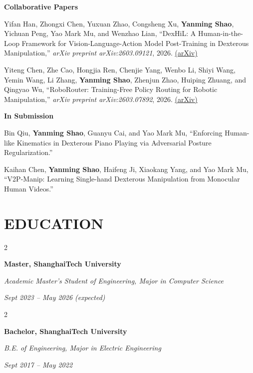 \documentclass[10pt, letterpaper]{article}
\newenvironment{twocolentry}[2][]{
    \onecolentry
    \def\secondColumn{#2}
    \setcolumnwidth{\fill, 4.5 cm}
    \begin{paracol}{2}
}{
    \switchcolumn \raggedleft \secondColumn
    \end{paracol}
    \endonecolentry
} %
\let\hrefWithoutArrow\href
\renewcommand{\href}[2]{\hrefWithoutArrow{#1}{\ifthenelse{\equal{#2}{}}{ }{#2 }\raisebox{.15ex}{\footnotesize \faExternalLink*}}}
\begin{document}
\textbf{Collaborative Papers}

\begin{enumerate}[label={[\arabic*]}, resume]
  \item Yifan Han, Zhongxi Chen, Yuxuan Zhao, Congsheng Xu, \textbf{Yanming Shao}, Yichuan Peng, Yao Mark Mu, and Wenzhao Lian,
        ``DexHiL: A Human-in-the-Loop Framework for Vision-Language-Action Model Post-Training in Dexterous Manipulation,''
        \emph{arXiv preprint arXiv:2603.09121}, 2026. \hrefWithoutArrow{https://arxiv.org/abs/2603.09121}{(arXiv)}

  \item Yiteng Chen, Zhe Cao, Hongjia Ren, Chenjie Yang, Wenbo Li, Shiyi Wang, Yemin Wang, Li Zhang, \textbf{Yanming Shao}, Zhenjun Zhao, Huiping Zhuang, and Qingyao Wu,
        ``RoboRouter: Training-Free Policy Routing for Robotic Manipulation,''
        \emph{arXiv preprint arXiv:2603.07892}, 2026. \hrefWithoutArrow{https://arxiv.org/abs/2603.07892}{(arXiv)}
\end{enumerate}

\textbf{In Submission}

\begin{enumerate}[label={[\arabic*]}, resume]
  \item Bin Qiu, \textbf{Yanming Shao}, Guanyu Cai, and Yao Mark Mu,
        ``Enforcing Human-like Kinematics in Dexterous Piano Playing via Adversarial Posture Regularization.''

  \item Kaihan Chen, \textbf{Yanming Shao}, Haifeng Ji, Xiaokang Yang, and Yao Mark Mu,
        ``V2P-Manip: Learning Single-hand Dexterous Manipulation from Monocular Human Videos.''
\end{enumerate}


\section{EDUCATION}

    \begin{twocolentry}{ 
    \textit{Sept 2023 – May 2026 (expected)}}
        \textbf{Master, ShanghaiTech University}
        
        \textit{Academic Master's Student of Engineering, Major in Computer Science}
    \end{twocolentry}

    \begin{twocolentry}{ 
    \textit{Sept 2017 – May 2022}}
        \textbf{Bachelor, ShanghaiTech University}
        
        \textit{B.E. of Engineering, Major in Electric Engineering}
    \end{twocolentry}
\end{document}
